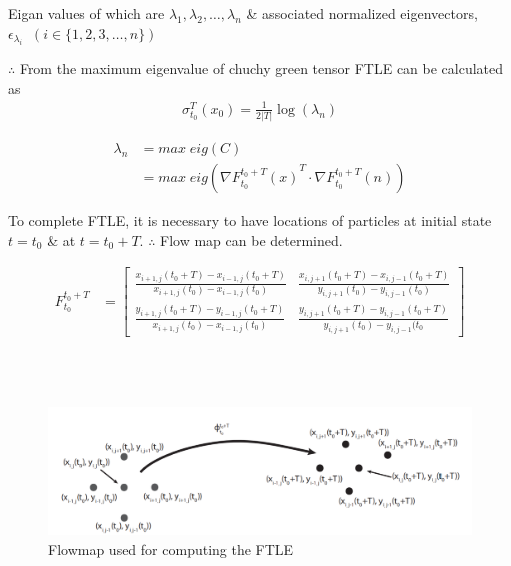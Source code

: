 \documentclass[../report.tex]{subfiles}
\begin{document}
Eigan values of which are \(\lambda_1, \lambda_2, \dots, \lambda_n\) \& associated normalized eigenvectors, \(\epsilon_{\lambda_i}\;\; (i \in \{1, 2, 3, \dots, n\})\)

\(\therefore\) From the maximum eigenvalue of chuchy green tensor FTLE can be calculated as
\begin{equation}
  \begin{aligned}
    \sigma_{t_0}^T (x_0) = \frac{1}{2|T|} \log(\lambda_n)
  \end{aligned}
\end{equation}

\begin{equation}
  \begin{aligned}
    \lambda_n &= max\; eig (C) \\
    &= max\; eig(\nabla {F_{t_0}^{t_0 + T}(x)}^T \cdot \nabla F_{t_0}^{t_0 + T}(n))
  \end{aligned}
\end{equation}

To complete FTLE, it is necessary to have locations of particles at initial state \(t = t_0\) \& at \(t = t_0 + T\). \(\therefore\) Flow map can be determined.

{\Large
\begin{equation}
  \begin{aligned}
    {F_{t_0}^{t_0 + T}} &= \begin{bmatrix}
      \frac{x_{i + 1, j}(t_0 + T) - x_{i - 1, j}(t_0 + T)}{x_{i+1, j}(t_0) - x_{i-1, j}(t_0)} & \frac{x_{i, j+1}(t_0 + T) - x_{i,j-1}(t_0 + T)}{y_{i,j+1}(t_0) - y_{i,j-1}(t_0)} \\[12pt]
      
      \frac{y_{i+1, j}(t_0 + T) - y_{i-1, j}(t_0 + T)}{x_{i+1,j}(t_0) - x_{i-1, j}(t_0)} & \frac{y_{i,j+1}(t_0 + T) - y_{i, j - 1}(t_0 + T)}{y_{i, j+1}(t_0) - y_{i, j-1}(t_0}
    \end{bmatrix}
  \end{aligned}
\end{equation}
}

~ \\ ~ \\
\begin{figure}[H]
  \centering
  \includegraphics[width=0.8\linewidth]{images/image_1.png}
  \caption{Flowmap used for computing the FTLE}
  \label{fig:fig-1}
\end{figure}
\end{document}
